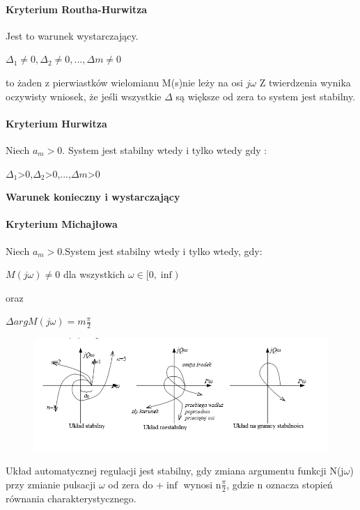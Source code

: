 \documentclass[a4paper,twoside]{report}
\begin{document}
\paragraph{Kryterium Routha-Hurwitza}
Jest to warunek wystarczający.
\begin{center}
	$\Delta_{1}\neq 0,\Delta_{2}\neq 0,...,\Delta{m}\neq 0 $
\end{center}
to żaden z pierwiastków wielomianu M(s)nie leży na osi $j\omega $
Z twierdzenia wynika oczywisty wniosek, że jeśli wszystkie $ \Delta$ są większe od zera to system jest stabilny.


\paragraph{Kryterium Hurwitza}
Niech $ a_{m}>0$. System jest stabilny wtedy i tylko wtedy gdy :
\begin{center}
	$\Delta_{1}$>0,$\Delta_{2}$>0,...,$\Delta{m}$>0
\end{center}
\textbf{Warunek konieczny i wystarczający}
\paragraph{Kryterium Michajłowa}
Niech $ a_{m}>0$.System jest stabilny wtedy i tylko wtedy, gdy:
\begin{center}
	$ M(j\omega)\neq 0$ dla wszystkich $\omega \in [0,\inf) $ 
\end{center}
oraz
\begin{center}
	$\Delta arg M(j\omega)= m\frac{\pi}{2}  $
\end{center}
\begin{figure}[H]
	\includegraphics[scale=0.7]{obrazy/dynamiczne/Michajlow_przyklad.png}
\end{figure}
Układ automatycznej regulacji jest stabilny, gdy zmiana argumentu funkcji N(j$\omega$) przy zmianie pulsacji $\omega$
od zera do +$\inf$ wynosi n$\frac{\pi}{2}$, gdzie n oznacza stopień równania charakterystycznego.
\end{document}
